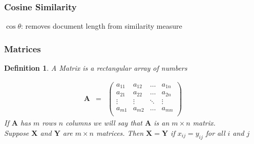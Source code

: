 \documentclass{beamer}
\newtheorem{defn}{Definition}
\numberwithin{equation}{section}
\begin{document}
\begin{frame}
\frametitle{Cosine Similarity}


\begin{center}
\end{center}



$\cos \theta$: removes document length from similarity measure\\ \pause 
{} 





\pause \pause \pause \pause \pause   \pause \pause \pause 
 

\end{frame}



\begin{frame}
\frametitle{Matrices}

\begin{defn}
A \alert{Matrix} is a rectangular array of numbers


\begin{eqnarray}
\boldsymbol{A} & = &  
\begin{pmatrix}
a_{11} & a_{12} & \hdots & a_{1n} \\
a_{21} & a_{22} & \hdots & a_{2n} \\
\vdots & \vdots & \ddots & \vdots \\
a_{m1} & a_{m2} & \hdots & a_{mn} \\
\end{pmatrix} 
\nonumber 
\end{eqnarray}
If $\boldsymbol{A}$ has $m$ rows $n$ columns we will say that $\boldsymbol{A}$ is an $m \times n$ matrix.  \\
Suppose $\boldsymbol{X}$ and $\boldsymbol{Y}$ are $m \times n$ matrices.  Then $\boldsymbol{X} = \boldsymbol{Y}$ if 
$x_{ij} = y_{ij}$ for all $i$ and $j$ 

\end{defn}
\end{frame}
\end{document}
